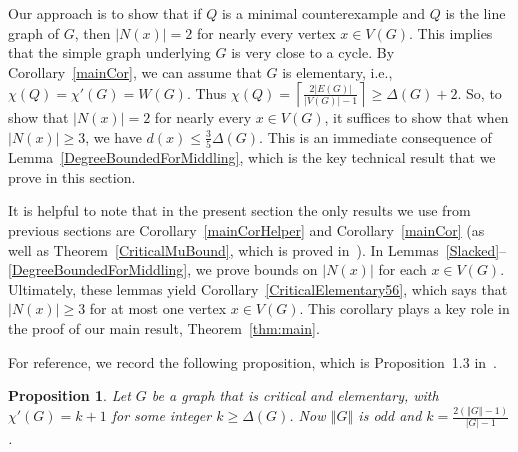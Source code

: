 \documentclass[12pt]{article}
\theoremstyle{plain}
\newtheorem{prop}[thm]{Proposition}
\theoremstyle{definition}
\theoremstyle{remark}
\newcommand{\card}[1]{\left|#1\right|}
\newcommand{\size}[1]{\left\Vert#1\right\Vert}
\newcommand{\ceil}[1]{\left\lceil#1\right\rceil}
\begin{document}
Our approach is to show that if $Q$ is a minimal counterexample and $Q$ is the
line graph of $G$, then $\card{N(x)}=2$ for nearly every vertex $x\in V(G)$.  This
implies that the simple graph underlying $G$ is very close to a cycle.
By Corollary~\ref{mainCor}, we can assume that $G$ is elementary, i.e.,
$\chi(Q)=\chi'(G)=W(G)$.  Thus
$\chi(Q)=\ceil{\frac{2\card{E(G)}}{\card{V(G)}-1}}\ge\Delta(G)+2$.
So, to show that $\card{N(x)}=2$ for nearly every $x\in V(G)$, it suffices to show
that when $\card{N(x)}\ge 3$, we have $d(x)\le \frac35\Delta(G)$.  This is an
immediate consequence of Lemma~\ref{DegreeBoundedForMiddling}, which is the key
technical result that we prove in this section.

It is helpful to note that in the present section the only results we use from
previous sections are Corollary~\ref{mainCorHelper} and Corollary~\ref{mainCor}
(as well as Theorem~\ref{CriticalMuBound}, which is proved
in~\cite{rabern2011strengthening}).
In Lemmas~\ref{Slacked}--\ref{DegreeBoundedForMiddling},
we prove bounds on $\card{N(x)}$ for each $x\in V(G)$.  Ultimately, these lemmas
yield Corollary~\ref{CriticalElementary56}, which says that $\card{N(x)}\ge 3$
for at most one vertex $x\in V(G)$.  This corollary plays a key role in the
proof of our main result, Theorem~\ref{thm:main}.

For reference, we record the following proposition, which is Proposition~1.3
in~\cite{SSTF}.
\begin{prop}
\label{easy-prop}
Let $G$ be a graph that is critical and elementary, with $\chi'(G)=k+1$ for some
integer $k\ge \Delta(G)$.  Now $\size{G}$ is odd and
$k=\frac{2(\size{G}-1)}{\card{G}-1}$.
\end{prop}
\end{document}
